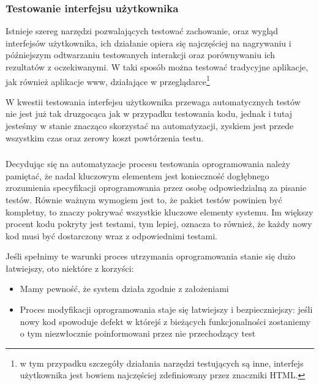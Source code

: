      \subsubsection{Testowanie interfejsu użytkownika}
        
        Istnieje szereg narzędzi pozwalających testować zachowanie, oraz wygląd interfejsów użytkownika, ich działanie opiera się najczęściej na nagrywaniu i późniejszym odtwarzaniu testowanych interakcji oraz porównywaniu ich rezultatów z oczekiwanymi. W taki sposób można testować tradycyjne aplikacje, jak również aplikacje www, działające w przeglądarce\footnote{w tym  przypadku szczegóły działania narzędzi testujących są inne, interfejs użytkownika jest bowiem najczęściej zdefiniowany przez znaczniki HTML.}
        
        W kwestii testowania interfejsu użytkownika przewaga automatycznych testów nie jest już tak druzgocąca jak w przypadku testowania kodu, jednak i tutaj jesteśmy w stanie znacząco skorzystać na automatyzacji, zyskiem jest przede wszystkim czas oraz zerowy koszt powtórzenia testu.
        
      \subsubsection{}

        Decydując się na automatyzacje procesu testowania oprogramowania należy pamiętać, że nadal kluczowym elementem jest konieczność dogłębnego zrozumienia specyfikacji oprogramowania przez osobę odpowiedzialną za pisanie testów. Równie ważnym wymogiem jest to, że pakiet testów powinien być kompletny, to znaczy pokrywać wszystkie kluczowe elementy systemu. Im większy procent kodu pokryty jest testami, tym lepiej, oznacza to również, że każdy nowy kod musi być dostarczony wraz z odpowiednimi testami.
        
        Jeśli spełnimy te warunki proces utrzymania oprogramowania stanie się dużo łatwiejszy, oto niektóre z korzyści:
        
         \begin{itemize}
     	    \item Mamy pewność, że system działa zgodnie z założeniami
     	    \item Proces modyfikacji oprogramowania staje się łatwiejszy i bezpieczniejszy: jeśli nowy kod spowoduje defekt w którejś z bieżących funkcjonalności zostaniemy o tym niezwłocznie poinformowani przez nie przechodzący test
     	  \end{itemize}

